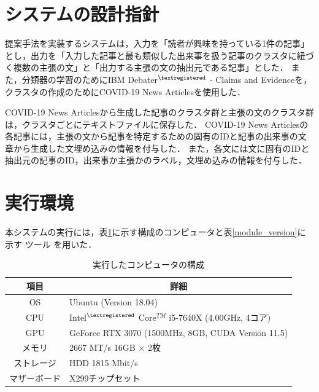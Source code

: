 \documentclass[12pt,a4j,dvipdfmx]{jreport}
\begin{document}
\section{システムの設計指針}
\label{section_system_plan}
提案手法を実装するシステムは，入力を「読者が興味を持っている1件の記事」とし，出力を「入力した記事と最も類似した出来事を扱う記事のクラスタに紐づく複数の主張の文」と「出力する主張の文の抽出元である記事」とした．
また，分類器の学習のためにIBM Debater$^{\textregistered}$ - Claims and Evidenceを，クラスタの作成のためにCOVID-19 News Articlesを使用した．

COVID-19 News Articlesから生成した記事のクラスタ群と主張の文のクラスタ群は，クラスタごとにテキストファイルに保存した．
COVID-19 News Articlesの各記事には，主張の文から記事を特定するための固有のIDと記事の出来事の文章から生成した文埋め込みの情報を付与した．
また，各文には文に固有のIDと抽出元の記事のID，出来事か主張かのラベル，文埋め込みの情報を付与した．



\section{実行環境}
\label{section_environment}
本システムの実行には，表\ref{pc_spec}に示す構成のコンピュータと表\ref{module_version}に示す
ツール
を用いた．

\begin{table}[H]
  \caption{実行したコンピュータの構成}
  \centering
  \vspace{4mm}
  \begin{tabular}{cl}
    \hline
    項目 & \multicolumn{1}{c}{詳細} \\
    \hline
    OS & Ubuntu (Version 18.04) \\
    CPU & Intel$^{\textregistered}$ Core$^{TM}$ i5-7640X (4.00GHz, 4コア) \\
    GPU & GeForce RTX 3070 (1500MHz, 8GB,
    CUDA Version 11.5) \\
    メモリ & 2667 MT/s 16GB $\times$ 2枚 \\
    ストレージ & HDD 1815 Mbit/s \\
    マザーボード & X299チップセット \\
    \hline
    \end{tabular}
  \label{pc_spec}
\end{table}
\end{document}

